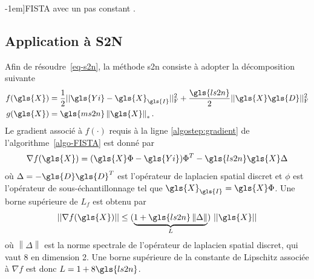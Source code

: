 \begin{algorithme}
    \begin{minipage}{\textwidth}
        \begin{algorithm}[H]
        \end{algorithm}
    \end{minipage}
    \caption[][-1em]{FISTA avec un pas constant \cite{beck_fast_2009}.\protect\label{algo-FISTA}}
\end{algorithme}

\subsection{Application à S2N}

Afin de résoudre~\eqref{eq-s2n}, la méthode \gls{s2n} consiste à adopter la décomposition suivante
\begin{align}
    f(\gls{X}) &= \frac{1}{2}\frobnorm{\gls{Yi}-\gls{X}_{\gls{I}}} + \frac{\gls{ls2n}}{2}\frobnorm{\gls{X} \gls{D}}\\
    g(\gls{X}) &= \gls{ms2n} \left\|\gls{X}\right\|_*.
\end{align}
Le gradient associé à $f(\cdot)$ requis à la ligne \ref{algostep:gradient} de l'algorithme~\ref{algo-FISTA} est donné par
\begin{equation}
    \nabla f(\gls{X}) = (\gls{X}\Phi - \gls{Yi})\Phi^T - \gls{ls2n} \gls{X} \Delta
\end{equation}
où $\Delta = -\gls{D}\gls{D}^T$ est l'opérateur de laplacien spatial discret et $\phi$ est l'opérateur de sous-échantillonnage tel que $\gls{X}_{\gls{I}} = \gls{X}\Phi$.
Une borne supérieure de $L_f$ est obtenu par
\begin{equation}
    ||\nabla f(\gls{X})||\leq (\underbrace{1+\gls{ls2n} \left\|\Delta\right\|}_{L})\ ||\gls{X}||
\end{equation}
où $\left\|\Delta\right\|$ est la norme spectrale de l'opérateur de laplacien spatial discret, qui vaut 8 en dimension 2. Une borne supérieure de la constante de Lipschitz associée à $\nabla f$ est donc $L= 1 +8\gls{ls2n}$. 

